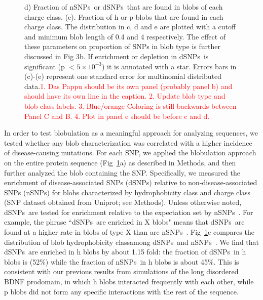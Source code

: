 \documentclass[10pt,letterpaper]{article}
\newcommand{\dSNPs}{dSNPs~}
\newcommand{\nSNPs}{nSNPs~}
\newcommand{\hydrochar}{hydrophobicity class}
\newcommand{\chargechar}{charge class}
\newcommand{\grace}[1]{\textcolor{red}{#1}}
\newcommand{\ruchi}[1]{\textcolor{blue}{#1}}
\begin{document}
\begin{figure}[!ht]
{d) Fraction of \nSNPs or \dSNPs that are found in blobs of each \chargechar.  (e). Fraction of h or p blobs that are found in each \chargechar.  The distribution in c, d and e are plotted with a cutoff and minimum blob length of 0.4 and 4 respectively. The effect of these parameters on proportion of SNPs in blob type is further discussed in Fig 3b. If enrichment or depletion in \dSNPs is significant (p $< 5\times10^{-3}$) it is annotated with a star.  Errors bars in (c)-(e) represent one standard error for multinomial distributed data.\grace{1. Das Pappu should be its own panel (probably panel b) and should have its own line in the caption. 2. Update blob type and blob class labels. 3. Blue/orange Coloring is still backwards between Panel C and B. 4. Plot in panel e should be before c and d. }  }
\label{c3_h_p_enrich} 
\end{figure}



In order to test blobulation as a meaningful approach for analyzing sequences, we tested whether any blob characterization was correlated with a higher incidence of disease-causing mutations. For each SNP, we applied the blobulation approach on the entire protein sequence (Fig~\ref{c3_h_p_enrich}a) as described in Methods, and then further analyzed the blob containing the SNP. Specifically, we measured the enrichment of disease-associated SNPs (dSNPs) relative to non-disease-associated SNPs (nSNPs) for blobs characterized by \hydrochar{} and \chargechar{} (SNP dataset obtained from Uniprot; see Methods). Unless otherwise noted, \dSNPs are tested for enrichment relative to the expectation set by \nSNPs. For example, the phrase ``\dSNPs are enriched in X blobs" means that \dSNPs are found at a higher rate in blobs of type X than are \nSNPs. Fig~\ref{c3_h_p_enrich}c compares the distribution of blob \hydrochar among \dSNPs and \nSNPs. We find that \dSNPs are enriched in h blobs by about 1.15 fold:  the fraction of \dSNPs in h blobs is (52\%) while the fraction of \nSNPs in h blobs is about 45\%. This is consistent with our previous results from simulations of the long disordered BDNF prodomain, in which h blobs interacted frequently with each other, while p blobs did not form any specific interactions with the rest of the sequence.
\end{document}
